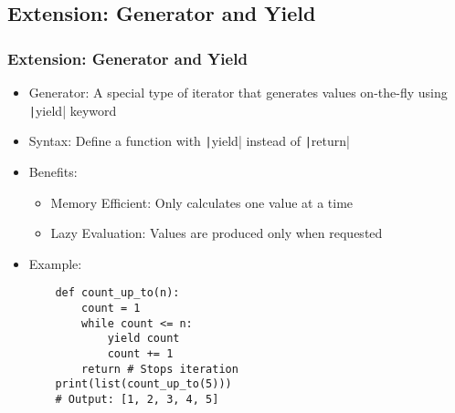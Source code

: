 \documentclass{beamer}
\newcommand{\python}[1]{\texttt|#1|}
\begin{document}
\subsection{Extension: Generator and Yield}
\begin{frame}[fragile]
    \frametitle{Extension: Generator and Yield}
    \begin{itemize}
        \item Generator: A special type of iterator that generates values on-the-fly using \python{yield} keyword
        \item Syntax: Define a function with \python{yield} instead of \python{return}
        \item Benefits:
              \begin{itemize}
                  \item Memory Efficient: Only calculates one value at a time
                  \item Lazy Evaluation: Values are produced only when requested
              \end{itemize}
        \item Example:
              \begin{verbatim}
    def count_up_to(n):
        count = 1
        while count <= n:
            yield count
            count += 1
        return # Stops iteration
    print(list(count_up_to(5)))
    # Output: [1, 2, 3, 4, 5]
    \end{verbatim}
    \end{itemize}
\end{frame}
\end{document}
